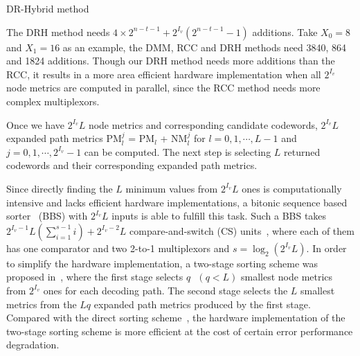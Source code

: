 \documentclass[journal]{IEEEtran}
\begin{document}
\begin{algorithm}
\caption{DR-Hybrid method}
\label{algo: dr_hyp}
\LinesNumbered
{}
\end{algorithm}

The DRH method needs $4\times 2^{n-t-1}+2^{I_v}(2^{n-t-1}-1)$ additions. Take $X_0=8$ and $X_1=16$ as an example, the DMM, RCC and DRH methods need 3840, 864 and 1824 additions. Though our DRH method needs more additions than the RCC, it results in a more area efficient hardware implementation when all $2^{I_v}$ node metrics are computed in parallel, since the RCC method needs more complex multiplexors.


Once we have $2^{I_v}L$ node metrics and corresponding candidate codewords, $2^{I_v}L$ expanded path metrics PM$_l^j$ = PM$_l$ + NM$_l^j$ for $l=0,1,\cdots,L-1$ and $j=0,1,\cdots,2^{I_v}-1$ can be computed. The next step is selecting $L$ returned codewords and their corresponding expanded path metrics.

Since directly finding the $L$ minimum values from $2^{I_v}L$ ones is computationally intensive and lacks efficient hardware implementations, a bitonic sequence based sorter~\cite{jun_low_mem_list} (BBS) with $2^{I_v}L$ inputs is able to fulfill this task. Such a BBS takes $2^{I_v-1}L(\sum_{i=1}^{s-1}i)+2^{I_v-2}L$ compare-and-switch (CS) units~\cite{jun_low_mem_list}, where each of them has one comparator and two 2-to-1 multiplexors and $s=\log_2(2^{I_v}L)$.
In order to simplify the hardware implementation, a two-stage sorting scheme was proposed in~\cite{chenrong_tsp}, where the first stage selects $q\mbox{ }(q<L)$ smallest node metrics from $2^{I_v}$ ones for each decoding path. The second stage selects the $L$ smallest metrics from the $Lq$ expanded path metrics produced by the first stage. Compared with the direct sorting scheme~\cite{jun_low_mem_list, yuan_low_latency}, the hardware implementation of the two-stage sorting scheme is more efficient at the cost of certain error performance degradation.
\end{document}
